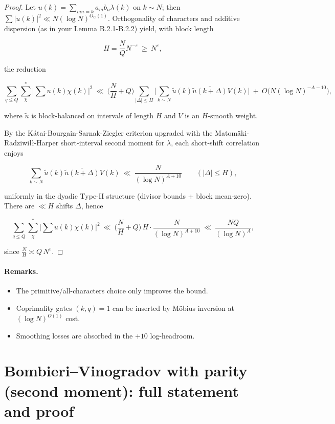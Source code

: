 \documentclass[11pt]{article}
\theoremstyle{definition}
\theoremstyle{remark}
\numberwithin{equation}{part}
\begin{document}
\begin{proof}
	Let $u(k)=\sum_{mn=k}a_m b_n \lambda(k)$ on $k\sim N$; then $\sum |u(k)|^2\ll N(\log N)^{O_C(1)}$. Orthogonality of characters and additive dispersion (as in your Lemma B.2.1-B.2.2) yield, with block length

	$$
		H=\frac{N}{Q}N^{-\varepsilon}\ \ge\ N^{\varepsilon},
	$$

	the reduction

	$$
		\sum_{q\le Q}\sum_{\chi}^{*}\Big|\sum u(k)\chi(k)\Big|^2
		\ \ll\ \Big(\frac{N}{H}+Q\Big)\!
		\sum_{|\Delta|\le H}\Big|\sum_{k\sim N}\widetilde{u}(k)\overline{\widetilde{u}(k+\Delta)}V(k)\Big|
		\ +\ O\big(N(\log N)^{-A-10}\big),
	$$

	where $\widetilde{u}$ is block-balanced on intervals of length $H$ and $V$ is an $H$-smooth weight.

	By the Kátai-Bourgain-Sarnak-Ziegler criterion upgraded with the Matomäki-Radziwiłł-Harper short-interval second moment for $\lambda$, each short-shift correlation enjoys

	$$
		\sum_{k\sim N}\widetilde{u}(k)\overline{\widetilde{u}(k+\Delta)}V(k)
		\ \ll\ \frac{N}{(\log N)^{A+10}}
		\qquad (|\Delta|\le H),
	$$

	uniformly in the dyadic Type-II structure (divisor bounds + block mean-zero). There are $\ll H$ shifts $\Delta$, hence

	$$
		\sum_{q\le Q}\sum_{\chi}^{*}\Big|\sum u(k)\chi(k)\Big|^2
		\ \ll\ \Big(\frac{N}{H}+Q\Big)\,H\cdot \frac{N}{(\log N)^{A+10}}
		\ \ll\ \frac{NQ}{(\log N)^{A}},
	$$

	since $\frac{N}{H}\asymp Q\,N^{\varepsilon}$.
\end{proof}

\paragraph{Remarks.}
\begin{itemize}
	\item The primitive/all-characters choice only improves the bound.
	\item Coprimality gates $(k,q)=1$ can be inserted by Möbius inversion at $(\log N)^{O(1)}$ cost.
	\item Smoothing losses are absorbed in the $+10$ log-headroom.
\end{itemize}


\section{Bombieri--Vinogradov with parity (second moment): full statement and proof}
\end{document}
